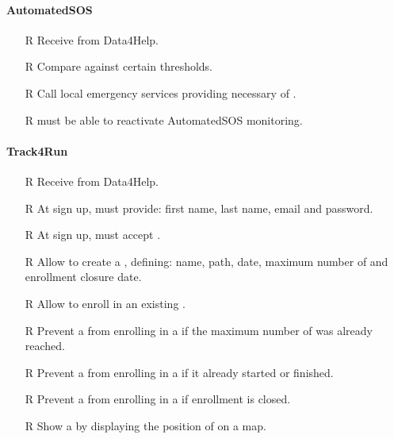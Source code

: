 \documentclass[../../../rasd.tex]{subfiles}
\begin{document}
        \paragraph{AutomatedSOS}
        \begin{itemize}
            \item[R\subs{36}]Receive  from Data4Help.
            \item[R\subs{37}]Compare  against certain thresholds.
            \item[R\subs{38}]Call local emergency services providing necessary  of .
            \item[R\subs{39}] must be able to reactivate AutomatedSOS monitoring.
        \end{itemize}

        \paragraph{Track4Run}
        \begin{itemize}
            \item[R\subs{40}]Receive  from Data4Help.
            \item[R\subs{41}]At sign up,  must provide: first name, last name, email and password.
            \item[R\subs{42}]At sign up,  must accept .
            \item[R\subs{43}]Allow  to create a , defining: name, path, date, maximum number of  and enrollment closure date. 
            \item[R\subs{44}]Allow  to enroll in an existing .
            \item[R\subs{45}]Prevent a  from enrolling in a  if the maximum number of  was already reached.
            \item[R\subs{46}]Prevent a  from enrolling in a  if it already started or finished.
            \item[R\subs{47}]Prevent a  from enrolling in a  if enrollment is closed.
            \item[R\subs{48}]Show a  by displaying the position of  on a map.
        \end{itemize}
        \mbox{}\\
\end{document}
